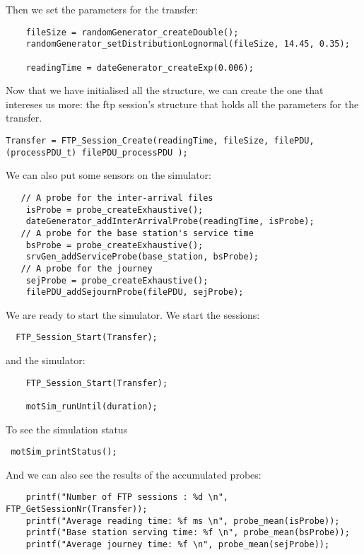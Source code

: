 Then we set the parameters for the transfer:
\begin{verbatim}
    fileSize = randomGenerator_createDouble();
    randomGenerator_setDistributionLognormal(fileSize, 14.45, 0.35);
  
    readingTime = dateGenerator_createExp(0.006);
\end{verbatim}

Now that we have initialised all the structure, we can create the one that intereses us more: the ftp session's structure that holds all the parameters for the transfer.
\begin{verbatim}
Transfer = FTP_Session_Create(readingTime, fileSize, filePDU, (processPDU_t) filePDU_processPDU );
\end{verbatim}

We can also put some sensors on the simulator:
\begin{verbatim}
   // A probe for the inter-arrival files
    isProbe = probe_createExhaustive();
    dateGenerator_addInterArrivalProbe(readingTime, isProbe);
   // A probe for the base station's service time
    bsProbe = probe_createExhaustive();
    srvGen_addServiceProbe(base_station, bsProbe);
   // A probe for the journey 
    sejProbe = probe_createExhaustive();
    filePDU_addSejournProbe(filePDU, sejProbe);
\end{verbatim}

 We are ready to start the simulator. We start the sessions:
\begin{verbatim}
  FTP_Session_Start(Transfer);
\end{verbatim}
and the simulator:
\begin{verbatim}
    FTP_Session_Start(Transfer);

    motSim_runUntil(duration);
\end{verbatim}
 To see the simulation status
\begin{verbatim}
 motSim_printStatus();
\end{verbatim}
And we can also see the results of the accumulated probes:
\begin{verbatim}
    printf("Number of FTP sessions : %d \n", FTP_GetSessionNr(Transfer));
    printf("Average reading time: %f ms \n", probe_mean(isProbe));
    printf("Base station serving time: %f \n", probe_mean(bsProbe));
    printf("Average journey time: %f \n", probe_mean(sejProbe));
\end{verbatim}








